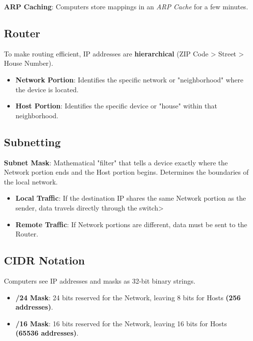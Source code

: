 \documentclass[12pt, letterpaper]{article}
\begin{document}
\textbf{ARP Caching}: Computers store mappings in an \textit{ARP Cache} for a few minutes.

\subsection*{Router}

To make routing efficient, IP addresses are \textbf{hierarchical} (ZIP Code > Street > House Number).

\begin{itemize}
    \item \textbf{Network Portion}: Identifies the specific network or "neighborhood" where the device is located.
    \item \textbf{Host Portion}: Identifies the specific device or "house" within that neighborhood.
\end{itemize}

\subsection*{Subnetting}

\textbf{Subnet Mask}: Mathematical "filter" that tells a device exactly where the Network portion ends and the Host portion begins. Determines the boundaries of the local network.
\medskip


\begin{itemize}
    \item \textbf{Local Traffic}: If the destination IP shares the same Network portion as the sender, data travels directly through the switch>
    \item \textbf{Remote Traffic}: If Network portions are different, data must be sent to the Router.
\end{itemize}

\subsection*{CIDR Notation}

Computers see IP addresses and masks as 32-bit binary strings.
\begin{itemize}
    \item \textbf{/24 Mask}: 24 bits reserved for the Network, leaving 8 bits for Hosts \textbf{(256 addresses)}.
    \item \textbf{/16 Mask}: 16 bits reserved for the Network, leaving 16 bits for Hosts \textbf{(65536 addresses)}.
\end{itemize}
\end{document}
